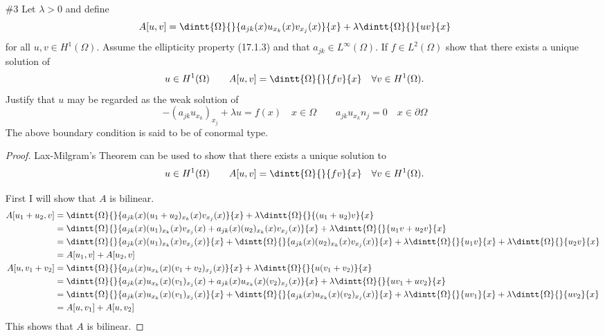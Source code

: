\documentclass[11pt, oneside]{article}
\begin{document}
\begin{enumerate}
\begin{proof}
      Now Lax-Milgram's Theorem states that there exists a unique solution to
      \[
        \dintt{\Omega}{}{\nabla u \nabla v + c(x) uv}{x} = \dintt{\Omega}{}{fv}{x}
      \]
      for all $v \in H^1_0(\Omega)$.
      This also implies that there is a weak solution to
      \[
        -\Delta u + c(x) u = f \quad x \in \Omega \qquad u = 0 \quad \forall x \in \partial \Omega
      \]
    \end{proof}

  \pagebreak
  \item[\#3]
    Let $\lambda > 0$ and define
    \[
      A[u, v] = \dintt{\Omega}{}{a_{jk}(x)u_{x_k}(x) v_{x_j}(x)}{x} + \lambda \dintt{\Omega}{}{uv}{x}
    \]
    for all $u, v \in H^1(\Omega)$.
    Assume the ellipticity property (17.1.3) and that $a_{jk} \in L^{\infty}(\Omega)$.
    If $f \in L^2(\Omega)$ show that there exists a unique solution of
    \[
      u \in H^1(\Omega) \qquad A[u, v] = \dintt{\Omega}{}{fv}{x} \quad \forall v \in H^1(\Omega).
    \]
    Justify that $u$ may be regarded as the weak solution of
    \[
      -(a_{jk}u_{x_k})_{x_j} + \lambda u = f(x) \quad x \in \Omega \qquad a_{jk}u_{x_k}n_j = 0 \quad x \in \partial \Omega
    \]
    The above boundary condition is said to be of conormal type.

    \begin{proof}
      Lax-Milgram's Theorem can be used to show that there exists a unique solution to
      \[
        u \in H^1(\Omega) \qquad A[u, v] = \dintt{\Omega}{}{fv}{x} \quad \forall v \in H^1(\Omega).
      \]

      First I will show that $A$ is bilinear.
      \begin{align*}
        A[u_1 + u_2, v] &= \dintt{\Omega}{}{a_{jk}(x)(u_1 + u_2)_{x_k}(x) v_{x_j}(x)}{x} + \lambda \dintt{\Omega}{}{(u_1 + u_2)v}{x} \\
        &= \dintt{\Omega}{}{a_{jk}(x)(u_1)_{x_k}(x)v_{x_j}(x) + a_{jk}(x)(u_2)_{x_k}(x) v_{x_j}(x)}{x} + \lambda \dintt{\Omega}{}{u_1v + u_2v}{x} \\
        &= \dintt{\Omega}{}{a_{jk}(x)(u_1)_{x_k}(x)v_{x_j}(x)}{x} + \dintt{\Omega}{}{a_{jk}(x)(u_2)_{x_k}(x) v_{x_j}(x)}{x} + \lambda \dintt{\Omega}{}{u_1v}{x} + \lambda\dintt{\Omega}{}{u_2v}{x} \\
        &= A[u_1, v] + A[u_2, v] \\
        A[u, v_1 + v_2] &= \dintt{\Omega}{}{a_{jk}(x)u_{x_k}(x) (v_1 + v_2)_{x_j}(x)}{x} + \lambda \dintt{\Omega}{}{u(v_1 + v_2)}{x} \\
        &= \dintt{\Omega}{}{a_{jk}(x)u_{x_k}(x)(v_1)_{x_j}(x) + a_{jk}(x)u_{x_k}(x)(v_2)_{x_j}(x)}{x} + \lambda \dintt{\Omega}{}{uv_1 + uv_2}{x} \\
        &= \dintt{\Omega}{}{a_{jk}(x)u_{x_k}(x)(v_1)_{x_j}(x)}{x} + \dintt{\Omega}{}{a_{jk}(x)u_{x_k}(x)(v_2)_{x_j}(x)}{x} + \lambda \dintt{\Omega}{}{uv_1}{x} + \lambda\dintt{\Omega}{}{uv_2}{x} \\
        &= A[u, v_1] + A[u, v_2]
      \end{align*}
      This shows that $A$ is bilinear.


\end{proof}
\end{enumerate}
\end{document}
